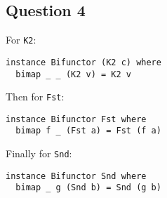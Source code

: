 \subsection*{Question 4}

For \lstinline{K2}:

\begin{lstlisting}
instance Bifunctor (K2 c) where
  bimap _ _ (K2 v) = K2 v
\end{lstlisting}

Then for \lstinline{Fst}:

\begin{lstlisting}
instance Bifunctor Fst where
  bimap f _ (Fst a) = Fst (f a)
\end{lstlisting}

Finally for \lstinline{Snd}:

\begin{lstlisting}
instance Bifunctor Snd where
  bimap _ g (Snd b) = Snd (g b)
\end{lstlisting}
